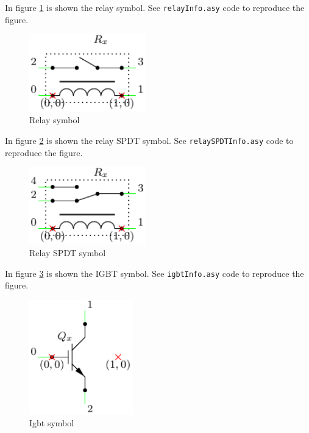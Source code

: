 \documentclass[a4paper,12pt]{report}
\begin{document}
In figure \ref{relayInfo} is shown the relay symbol. See \texttt{relayInfo.asy} code to reproduce the figure.

\begin{figure}[ht]
\centering
\includegraphics[width=0.45\textwidth]{relayInfo}
\caption{Relay symbol}
\label{relayInfo}
\end{figure}

In figure \ref{relaySPDTInfo} is shown the relay SPDT symbol. See \texttt{relaySPDTInfo.asy} code to reproduce the figure.

\begin{figure}[ht]
\centering
\includegraphics[width=0.45\textwidth]{relaySPDTInfo}
\caption{Relay SPDT symbol}
\label{relaySPDTInfo}
\end{figure}

In figure \ref{igbtInfo} is shown the IGBT symbol. See \texttt{igbtInfo.asy} code to reproduce the figure.

\begin{figure}[ht]
\centering
\includegraphics[width=0.4\textwidth]{igbtInfo}
\caption{Igbt symbol}
\label{igbtInfo}
\end{figure}
\end{document}
